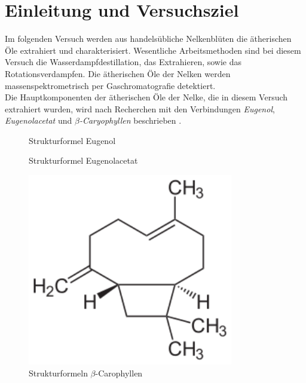 \section{Einleitung und Versuchsziel}
\label{sec:aufgabenstellung}

Im folgenden Versuch werden aus handelsübliche Nelkenblüten die ätherischen Öle extrahiert und charakterisiert. Wesentliche Arbeitsmethoden sind bei diesem Versuch die Wasserdampfdestillation, das Extrahieren, sowie das Rotationsverdampfen. Die ätherischen Öle der Nelken werden massenspektrometrisch per  Gaschromatografie detektiert.\\
Die Hauptkomponenten der ätherischen Öle der Nelke, die in diesem Versuch extrahiert wurden, wird nach Recherchen mit den Verbindungen \textit{Eugenol}, \textit{Eugenolacetat} und \textit{$\beta$-Caryophyllen} beschrieben \cite{Berger.2017,Krammer.2003,ROMPPRedaktion.2002}.


\begin{figure}[h!]
	\begin{minipage}{0.32\textwidth}
			\caption{Strukturformel Eugenol}\label{fig:eugenol}
	\end{minipage}\hfill
	\begin{minipage}{0.32\textwidth}
			\caption{Strukturformel Eugenolacetat}\label{fig:eegenol_ac}
	\end{minipage}\hfill
	\begin{minipage}{0.32\textwidth}
			\includegraphics[width=0.8\textwidth]{img/caro}
			\caption{Strukturformeln $\beta$-Carophyllen}\label{fig:caro}
	\end{minipage}\hfill
\end{figure}
\FloatBarrier


